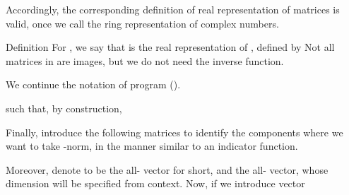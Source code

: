 Accordingly, the corresponding definition of real representation of matrices is valid, once we call the ring representation of complex numbers.

\Result
{Definition}
{
For , we say that  is the real representation of , defined by
Not all matrices in  are images, but we do not need the inverse function.
}

We continue the notation of program ().

such that, by construction,

Finally, introduce the following matrices to identify the components where we want to take -norm, in the manner similar to an indicator function.

Moreover, denote  to be the all- vector for short, and  the all- vector, whose dimension will be specified from context.
Now, if we introduce vector 

